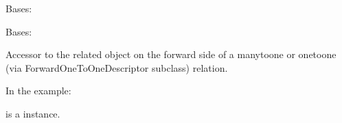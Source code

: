 \documentclass[letterpaper,10pt,english]{sphinxmanual}
\begin{document}
\begin{fulllineitems}
\begin{fulllineitems}
\label{\detokenize{pages_app.models:pages_app.models.page_block.PageBlock.DoesNotExist}}
\pysigstartsignatures
\pysigline
{}
\pysigstopsignatures
\sphinxAtStartPar
Bases: 

\end{fulllineitems}


\begin{fulllineitems}
\label{\detokenize{pages_app.models:pages_app.models.page_block.PageBlock.MultipleObjectsReturned}}
\pysigstartsignatures
\pysigline
{}
\pysigstopsignatures
\sphinxAtStartPar
Bases: 

\end{fulllineitems}


\begin{fulllineitems}
\label{\detokenize{pages_app.models:id20}}
\pysigstartsignatures
\pysigline
{}
\pysigstopsignatures
\sphinxAtStartPar
Accessor to the related object on the forward side of a many\sphinxhyphen{}to\sphinxhyphen{}one or
one\sphinxhyphen{}to\sphinxhyphen{}one (via ForwardOneToOneDescriptor subclass) relation.

\sphinxAtStartPar
In the example:

\begin{sphinxVerbatim}[commandchars=\\\{\}]
 
       
\end{sphinxVerbatim}

\sphinxAtStartPar
{} is a  instance.


\end{fulllineitems}
\end{fulllineitems}
\end{document}
